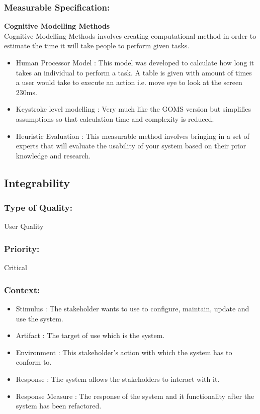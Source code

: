 \documentclass[11pt]{article}
\begin{document}
		\subsubsection{Measurable Specification:}
			\textbf{Cognitive Modelling Methods}\\
				Cognitive Modelling Methods involves creating computational method in order to estimate the time it will take people to perform given tasks.
			\begin{itemize}			
			
				\item Human Processor Model : This model was developed to calculate how long it takes an individual to perform a task. A table is given with amount of times a user would take to execute an action i.e. move eye to look at the screen 230ms.
				\item Keystroke level modelling : Very much like the GOMS version but simplifies assumptions so that calculation time and complexity is reduced.
				\item  Heuristic Evaluation	 : This measurable method involves bringing in a set of experts that will evaluate the usability of your system based on their prior knowledge and research. 
			
			\end{itemize}
		
	\subsection{Integrability}
		
		\subsubsection{Type of Quality:}
			\textbf{} User Quality
		
		\subsubsection{Priority:}
		\textbf{} Critical

		\subsubsection{Context:}
			\begin{itemize}
				\item Stimulus : The stakeholder wants to use to configure, maintain, update and use the system.
				\item Artifact : The target of use which is the system.
				\item Environment : This stakeholder’s action with which the system has to conform to.
				\item Response : The system allows the stakeholders to interact with it.
				\item Response Measure : The response of the system and it functionality after the system has  been refactored.
			\end{itemize}
		
\end{document}
